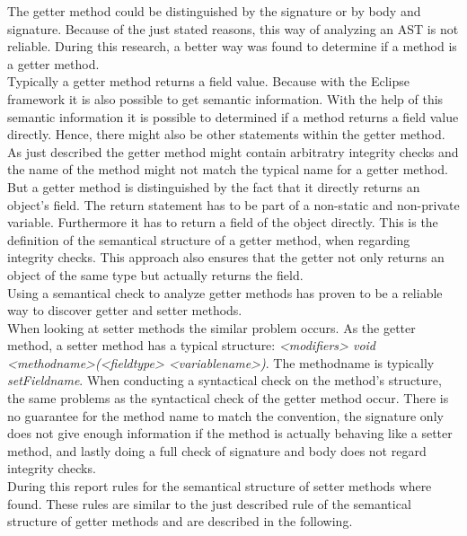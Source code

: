 The getter method could be distinguished by the signature or by body and signature. Because of the just stated reasons, this way of analyzing an \ac{AST} is not reliable. During this research, a better way was found to determine if a method is a getter method. 
\\

Typically a getter method returns a field value. Because with the Eclipse framework it is also possible to get semantic information. With the help of this semantic information it is possible to determined if a method returns a field value directly. Hence, there might also be other statements within the getter method. 
\\

As just described the getter method might contain arbitratry integrity checks and the name of the method might not match the typical name for a getter method. But a getter method is distinguished by the fact that it directly returns an object's field. The return statement has to be part of a non-static and non-private variable. Furthermore it has to return a field of the object directly. This is the definition of the semantical structure of a getter method, when regarding integrity checks. This approach also ensures that the getter not only returns an object of the same type but actually returns the field. 
\\

Using a semantical check to analyze getter methods has proven to be a reliable way to discover getter and setter methods.
\\

When looking at setter methods the similar problem occurs. As the getter method, a setter method has a typical structure: \textit{<modifiers> void <methodname>(<fieldtype> <variablename>)}. The methodname is typically \textit{setFieldname}. When conducting a syntactical check on the method's structure, the same problems as the syntactical check of the getter method occur. There is no guarantee for the method name to match the convention, the signature only does not give enough information if the method is actually behaving like a setter method, and lastly doing a full check of signature and body does not regard integrity checks.
\\

During this report rules for the semantical structure of setter methods where found. These rules are similar to the just described rule of the semantical structure of getter methods and are described in the following.
\\

